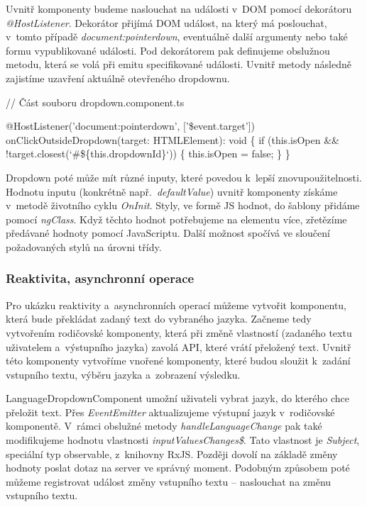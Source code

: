 Uvnitř komponenty budeme naslouchat na události v~DOM pomocí dekorátoru \emph{@HostListener}. 
Dekorátor přijímá DOM událost, na který má poslouchat, v~tomto případě \emph{document:pointerdown}, eventuálně další argumenty nebo také formu vypublikované události. 
Pod dekorátorem pak definujeme obslužnou metodu, která se volá při emitu specifikované události. Uvnitř metody následně zajistíme uzavření aktuálně otevřeného dropdownu.

\begin{prog}
// Část souboru dropdown.component.ts

@HostListener('document:pointerdown', ['\$event.target'])
onClickOutsideDropdown(target: HTMLElement): void \{
  if (this.isOpen && !target.closest(`#\$\{this.dropdownId\}`)) \{
    this.isOpen = false;
  \}
\}
\end{prog}

Dropdown poté může mít různé inputy, které povedou k~lepší znovupoužitelnosti. Hodnotu inputu (konkrétně např.~\emph{defaultValue}) uvnitř komponenty získáme v~metodě životního cyklu \emph{OnInit}. 
Styly, ve formě JS hodnot, do šablony přidáme pomocí \emph{ngClass}. Když těchto hodnot potřebujeme na elementu více, zřetězíme předávané hodnoty pomocí JavaScriptu. 
Další možnost spočívá ve sloučení požadovaných stylů na úrovni třídy.

\subsubsection*{Reaktivita, asynchronní operace}

Pro ukázku reaktivity a~asynchronních operací můžeme vytvořit komponentu, která bude překládat zadaný text do vybraného jazyka. 
Začneme tedy vytvořením rodičovské komponenty, která při změně vlastností (zadaného textu uživatelem a~výstupního jazyka) zavolá API, které vrátí přeložený text. 
Uvnitř této komponenty vytvoříme vnořené komponenty, které budou sloužit k~zadání vstupního textu, výběru jazyka a~zobrazení výsledku. 

LanguageDropdownComponent umožní uživateli vybrat jazyk, do kterého chce přeložit text. 
Přes \emph{EventEmitter} aktualizujeme výstupní jazyk v~rodičovské komponentě. V~rámci obslužné metody \emph{handleLanguageChange} pak také modifikujeme hodnotu vlastnosti \emph{inputValuesChanges\$}.
Tato vlastnost je \emph{Subject}, speciální typ observable, z~knihovny RxJS. Později dovolí na základě změny hodnoty poslat dotaz na server ve správný moment. 
Podobným způsobem poté můžeme registrovat událost změny vstupního textu -- naslouchat na změnu vstupního textu.

